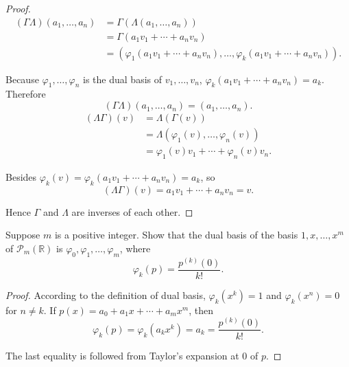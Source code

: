 \begin{proof}
    \begin{align*}
        (\Gamma\Lambda)(a_{1}, \ldots, a_{n}) & = \Gamma(\Lambda(a_{1}, \ldots, a_{n}))                                                                   \\
                                              & = \Gamma(a_{1}v_{1} + \cdots + a_{n}v_{n})                                                                \\
                                              & = (\varphi_{1}(a_{1}v_{1} + \cdots + a_{n}v_{n}), \ldots, \varphi_{k}(a_{1}v_{1} + \cdots + a_{n}v_{n})).
    \end{align*}

    Because $\varphi_{1}, \ldots, \varphi_{n}$ is the dual basis of $v_{1} , \ldots, v_{n}$, $\varphi_{k}(a_{1}v_{1} + \cdots + a_{n}v_{n}) = a_{k}$. Therefore
    \[
        (\Gamma\Lambda)(a_{1}, \ldots, a_{n}) = (a_{1}, \ldots, a_{n}).
    \]
    \begin{align*}
        (\Lambda\Gamma)(v) & = \Lambda(\Gamma(v))                                  \\
                           & = \Lambda(\varphi_{1}(v), \ldots, \varphi_{n}(v))     \\
                           & = \varphi_{1}(v)v_{1} + \cdots + \varphi_{n}(v)v_{n}.
    \end{align*}

    Besides $\varphi_{k}(v) = \varphi_{k}(a_{1}v_{1} + \cdots + a_{n}v_{n}) = a_{k}$, so
    \[
        (\Lambda\Gamma)(v) = a_{1}v_{1} + \cdots + a_{n}v_{n} = v.
    \]

    Hence $\Gamma$ and $\Lambda$ are inverses of each other.
\end{proof}
\newpage

\begin{exercise}
    Suppose $m$ is a positive integer. Show that the dual basis of the basis $1, x, \ldots, x^{m}$ of $\mathcal{P}_{m}(\mathbb{R})$ is $\varphi_{0}, \varphi_{1}, \ldots, \varphi_{m}$, where
    \[
        \varphi_{k}(p) = \frac{p^{(k)}(0)}{k!}.
    \]
\end{exercise}

\begin{proof}
    According to the definition of dual basis, $\varphi_{k}(x^{k}) = 1$ and $\varphi_{k}(x^{n}) = 0$ for $n\ne k$. If $p(x) = a_{0} + a_{1}x + \cdots + a_{m}x^{m}$, then
    \[
        \varphi_{k}(p) = \varphi_{k}(a_{k}x^{k}) = a_{k} = \frac{p^{(k)}(0)}{k!}.
    \]

    The last equality is followed from Taylor's expansion at $0$ of $p$.
\end{proof}
\newpage

